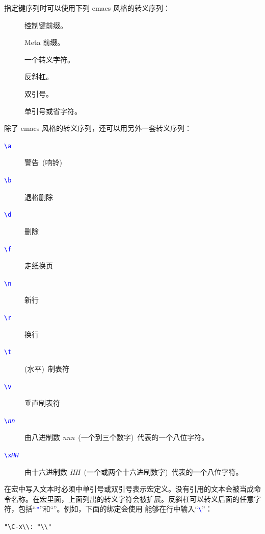 \documentclass[openany,notitlepage]{book}
\newcommand{\codeblock}[1]{\begin{center}\begin{minipage}{.7\textwidth}{\tt #1}\end{minipage}\end{center}}
\newcommand{\codeConstant}[1]{\textcolor[RGB]{0,205,0}{\texttt{#1}}}
\newcommand{\codeSpecial}[1]{\textcolor[RGB]{255,20,147}{\texttt{#1}}}
\newcommand{\codeStatement}[1]{\textcolor[RGB]{0,0,255}{\texttt{#1}}}
\newcommand{\code}[1]{\textcolor{blue}{{\tt #1}}}
\newcommand{\hl}[1]{{\sl #1}}
\begin{document}
\begin{CJK}{UTF8}{song}
\begin{description}
指定键序列时可以使用下列 emacs 风格的转义序列：
\begin{description}
    \item[] 控制键前缀。
    \item[] Meta 前缀。
    \item[] 一个转义字符。
    \item[\keystroke{\textbackslash\textbackslash}] 反斜杠。
    \item[] 双引号。
    \item[] 单引号或省字符。
\end{description}
除了 emacs 风格的转义序列，还可以用另外一套转义序列：
\begin{description}
    \item[\code{\textbackslash a}] 警告~(响铃)~
    \item[\code{\textbackslash b}] 退格删除
    \item[\code{\textbackslash d}] 删除
    \item[\code{\textbackslash f}] 走纸换页
    \item[\code{\textbackslash n}] 新行
    \item[\code{\textbackslash r}] 换行
    \item[\code{\textbackslash t}] (水平)~制表符
    \item[\code{\textbackslash v}] 垂直制表符
    \item[\code{\textbackslash \hl{nn}}] 由八进制数 \hl{nnn}~(一个到三个数字)~代表的一个八位字符。
    \item[\code{\textbackslash x\hl{HH}}] 由十六进制数 \hl{HH}~(一个或两个十六进制数字)~代表的一个八位字符。
\end{description}
在宏中写入文本时必须中单引号或双引号表示宏定义。没有引用的文本会被当成命令名称。在宏里面，上面列出的转义字符会被扩展。反斜杠可以转义后面的任意字符，包括``\code{"}''和``\code{}''。例如，下面的绑定会使用  \keystroke{\textbackslash\textbackslash} 能够在行中输入``\code{\textbackslash}''：
    \codeblock{\codeConstant{"}\codeSpecial{\textbackslash}\codeConstant{C-x\textbackslash\textbackslash}\codeStatement{:} "\textbackslash\textbackslash"}
\end{description}



\end{CJK}
\end{document}
